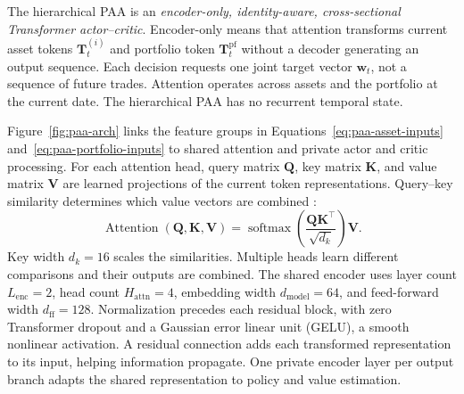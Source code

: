 The hierarchical PAA is an \emph{encoder-only, identity-aware, cross-sectional Transformer actor--critic}. Encoder-only means that attention transforms current asset tokens \(\mathbf T_t^{(i)}\) and portfolio token \(\mathbf T_t^{\mathrm{pf}}\) without a decoder generating an output sequence. Each decision requests one joint target vector \(\mathbf w_t\), not a sequence of future trades. Attention operates across assets and the portfolio at the current date. The hierarchical PAA has no recurrent temporal state.

Figure~\ref{fig:paa-arch} links the feature groups in Equations~\eqref{eq:paa-asset-inputs} and~\eqref{eq:paa-portfolio-inputs} to shared attention and private actor and critic processing. For each attention head, query matrix \(\mathbf Q\), key matrix \(\mathbf K\), and value matrix \(\mathbf V\) are learned projections of the current token representations. Query--key similarity determines which value vectors are combined \cite{vaswani2017}:
\begin{equation}
\operatorname{Attention}(\mathbf Q,\mathbf K,\mathbf V)=
\operatorname{softmax}\!\left(\frac{\mathbf Q\mathbf K^\top}{\sqrt{d_k}}\right)\mathbf V.
\label{eq:paa-attention}
\end{equation}
Key width \(d_k=16\) scales the similarities. Multiple heads learn different comparisons and their outputs are combined. The shared encoder uses layer count \(L_{\mathrm{enc}}=2\), head count \(H_{\mathrm{attn}}=4\), embedding width \(d_{\mathrm{model}}=64\), and feed-forward width \(d_{\mathrm{ff}}=128\). Normalization precedes each residual block, with zero Transformer dropout and a Gaussian error linear unit (GELU), a smooth nonlinear activation. A residual connection adds each transformed representation to its input, helping information propagate. One private encoder layer per output branch adapts the shared representation to policy and value estimation.

